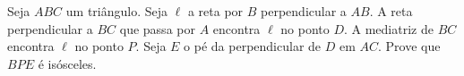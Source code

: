 Seja $ABC$ um triângulo. Seja $\ell$ a reta por $B$ perpendicular a $AB$. A reta perpendicular a $BC$ que passa por $A$ encontra $\ell$ no ponto $D$. A mediatriz de $BC$ encontra $\ell$ no ponto $P$. Seja $E$ o pé da perpendicular de $D$ em $AC$. Prove que $BPE$ é isósceles.
